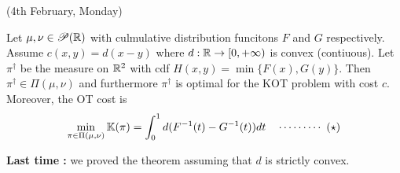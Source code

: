 \documentclass[12pt,a4paper]{article}
\begin{document}
\newday

(4th February, Monday)
\s

\thm Let $\mu, \nu \in \mathscr{P}(\mathbb{R})$ with culmulative distribution funcitons $F$ and $G$ respectively. Assume $c(x,y) = d(x-y)$ where $d: \mathbb{R} \rightarrow [0, +\infty)$ is convex (contiuous). Let $\pi^{\dagger}$ be the measure on $\mathbb{R}^2$ with cdf $H(x,y) = \min \{ F(x), G(y) \}$. Then $\pi^{\dagger} \in \Pi(\mu, \nu)$ and furthermore $\pi^{\dagger}$ is optimal for the KOT problem with cost $c$. Moreover, the OT cost is
\begin{align*}
\min_{\pi \in \Pi(\mu, \nu)} \mathbb{K}(\pi) = \int_0^1 d(F^{-1}(t) - G^{-1}(t)) dt \quad \cdots\cdots\cdots\,\,(\star)
\end{align*} 

\textbf{Last time :} we proved the theorem assuming that $d$ is strictly convex.
\end{document}
